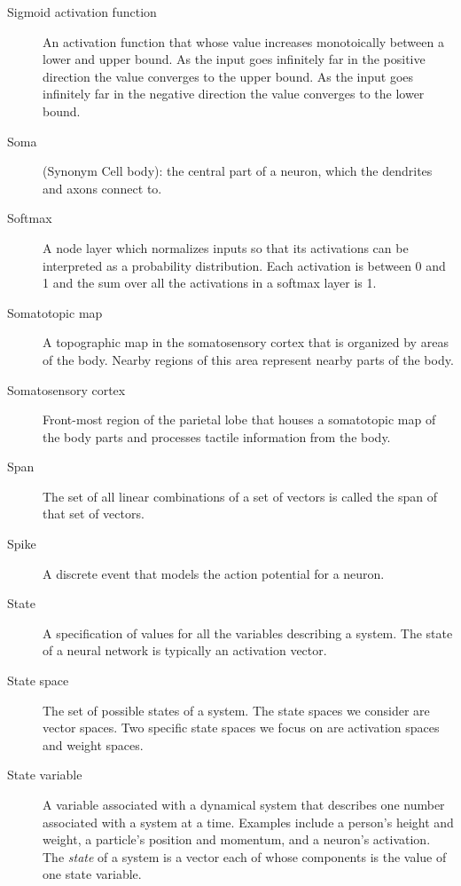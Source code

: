 \begin{description}
\item[Sigmoid activation function] An activation function that whose value increases monotoically between a lower and upper bound. As the input goes infinitely far in the positive direction the value converges to the upper bound. As the input goes infinitely far in the negative direction the value converges to the lower bound.


\item[Soma] (Synonym Cell body): the central part of a neuron, which the dendrites and axons connect to.

\item[Softmax] A node layer which normalizes inputs so that its activations can be interpreted as a probability distribution. Each activation is between 0 and 1 and the sum over all the activations in a softmax layer is 1. 

\item[Somatotopic map] A topographic map in the somatosensory cortex that is organized by areas of the body. Nearby regions of this area represent nearby parts of the body.

\item[Somatosensory cortex] Front-most region of the parietal lobe that houses a somatotopic map of the body parts and processes tactile information from the body.

\item[Span] The set of all linear combinations of a set of vectors is called the span of that set of vectors.

\item[Spike] A discrete event that models the action potential for a neuron.

\item[State] A specification of values for all the variables describing a system. The state of a neural network is typically an activation vector.

\item[State space] The set of possible states of a system. The state spaces we consider are vector spaces. Two specific state spaces we focus on are activation spaces and weight spaces.

\item[State variable] A variable associated with a dynamical system that describes one number associated with a system at a time. Examples include a person's height and weight, a particle's position and momentum, and a neuron's activation. The \emph{state} of a system is a vector each of whose components is the value of one state variable. 


\end{description}
